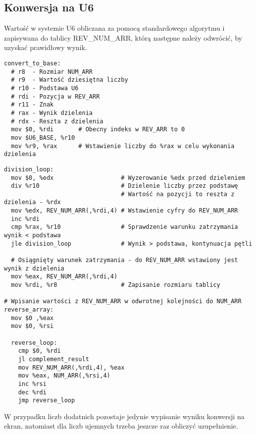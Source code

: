 \documentclass[11pt]{report}
\begin{document}
\subsection{Konwersja na U6}
Wartość w systemie U6 obliczana za pomocą standardowego algorytmu i zapisywana do tablicy REV\_NUM\_ARR, którą następne należy odwrócić, by uzyskać prawidłowy wynik.
\begin{verbatim}
convert_to_base:
  # r8  - Rozmiar NUM_ARR
  # r9  - Wartość dziesiętna liczby
  # r10 - Podstawa U6
  # rdi - Pozycja w REV_ARR
  # r11 - Znak
  # rax - Wynik dzielenia
  # rdx - Reszta z dzielenia
  mov $0, %rdi       # Obecny indeks w REV_ARR to 0
  mov $U6_BASE, %r10 
  mov %r9, %rax      # Wstawienie liczby do %rax w celu wykonania dzielenia
\end{verbatim}
\newpage
\noindent
\begin{verbatim}
division_loop:
  mov $0, %edx                   # Wyzerowanie %edx przed dzieleniem
  div %r10                       # Dzielenie liczby przez podstawę
                                 # Wartość na pozycji to reszta z dzielenia - %rdx
  mov %edx, REV_NUM_ARR(,%rdi,4) # Wstawienie cyfry do REV_NUM_ARR
  inc %rdi
  cmp %rax, %r10                 # Sprawdzenie warunku zatrzymania wynik < podstawa
  jle division_loop              # Wynik > podstawa, kontynuacja pętli
  
  # Osiągnięty warunek zatrzymania - do REV_NUM_ARR wstawiony jest wynik z dzielenia
  mov %eax, REV_NUM_ARR(,%rdi,4)
  mov %rdi, %r8                  # Zapisanie rozmiaru tablicy
  
# Wpisanie wartości z REV_NUM_ARR w odwrotnej kolejności do NUM_ARR
reverse_array:
  mov $0 ,%eax
  mov $0, %rsi
  
  reverse_loop:
    cmp $0, %rdi
    jl complement_result
    mov REV_NUM_ARR(,%rdi,4), %eax
    mov %eax, NUM_ARR(,%rsi,4)
    inc %rsi
    dec %rdi
    jmp reverse_loop
\end{verbatim}
W przypadku liczb dodatnich pozostaje jedynie wypisanie wyniku konwersji na ekran, natomiast dla liczb ujemnych trzeba jeszcze raz obliczyć uzupełnienie.
\newpage
\noindent
\end{document}
